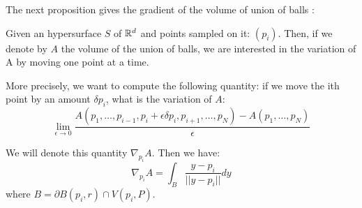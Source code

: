 The next proposition gives the gradient of the volume of union of balls :
\begin{proposition}
    Given an hypersurface $ S $ of $ \mathbb{R}^d $ and points sampled on it: $ (p_i) $.
    Then, if we denote by $ A $ the volume of the union of balls, we are
    interested in the variation of A by moving one point at a time.

    More precisely, we want to compute the following quantity: if we move the
    ith point by an amount $ \delta p_i $, what is the variation of $ A $:
    $$ \lim\limits_{\epsilon \to 0} \frac{A(p_1, \ldots, p_{i-1}, p_i + \epsilon
        \delta p_i, p_{i+1}, \ldots, p_N) - A(p_1, \ldots, p_N)}{\epsilon} $$

    We will denote this quantity $ \nabla_{p_i} A $. Then we have:
    \begin{equation}
        \label{eqn:gradient_area_2d}
        \nabla_{p_i} A = \int_{B} \frac{y - p_i}{||y - p_i||} dy
    \end{equation}
    where $ B = \partial B(p_i, r) \cap V(p_i, P) $.
\end{proposition}

